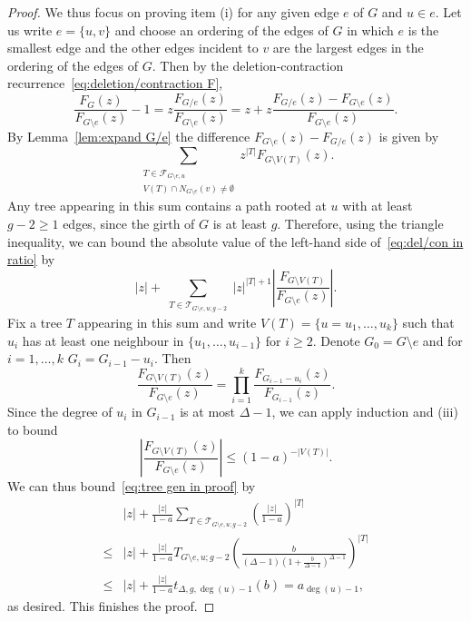 \documentclass[10pt,a4paper]{amsart}
\begin{document}
\begin{proof}
We thus focus on proving item (i) for any given edge $e$ of $G$ and $u\in e$.
Let us write $e=\{u,v\}$ and choose an ordering of the edges of $G$ in which $e$ is the smallest edge and the other edges incident to $v$ are the largest edges in the ordering of the edges of $G$.
Then by the deletion-contraction recurrence~\eqref{eq:deletion/contraction F}, 
\begin{equation}\label{eq:del/con in ratio}
\frac{F_G(z)}{F_{G\setminus e}(z)}-1=z\frac{F_{G/e}(z)}{F_{G\setminus e}(z)}=z+z\frac{F_{G/e}(z)-F_{G\setminus e}(z)}{F_{G\setminus e}(z)}.
 \end{equation}
By Lemma~\ref{lem:expand G/e} the difference $F_{G\setminus e}(z)-F_{G/e}(z)$ is given by
\[
\sum_{\substack{T\in \mathcal{F}_{G\setminus e,u}\\ V(T)\cap 
N_{G\setminus e}(v)\neq \emptyset}} z^{|T|}F_{G\setminus V(T)}(z).
\]
Any tree appearing in this sum contains a path rooted at $u$ with at least $g-2\ge 1$ edges, since the girth of $G$ is at least $g$.
Therefore, using the triangle inequality, we can bound the absolute value of the left-hand side of~\eqref{eq:del/con in ratio} by
\begin{equation}\label{eq:tree gen in proof}
|z|+\sum_{\substack{T\in \mathcal{T}_{G\setminus e,u;g-2}}}|z|^{|T|+1}\left|\frac{F_{G\setminus V(T)}}{F_{G\setminus e}(z)}\right|.
\end{equation}
Fix a tree $T$ appearing in this sum and write $V(T)=\{u=u_1,\ldots,u_k\}$ such that $u_i$ has at least one neighbour in $\{u_1,\ldots,u_{i-1}\}$ for $i\geq 2$. Denote $G_0=G\setminus e$ and for $i=1,\ldots, k$ $G_i=G_{i-1}-u_i$.
Then 
\begin{equation}\label{eq:telescope}
\frac{F_{G\setminus V(T)}(z)}{F_{G\setminus e}(z)}=\prod_{i=1}^k \frac{F_{G_{i-1}-u_i}(z)}{F_{G_{i-1}}(z)}.
\end{equation}
Since the degree of $u_i$ in $G_{i-1}$ is at most $\Delta-1$, we can apply induction and (iii) to bound 
\[
\left|
\frac{F_{G\setminus V(T)}(z)}{F_{G\setminus e}(z)}\right|\leq (1-a)^{-|V(T)|}.
\]
We can thus bound~\eqref{eq:tree gen in proof} by
\begin{align*}
&|z|+\frac{|z|}{1-a}\sum_{T\in \mathcal{T}_{G\setminus e,u;g-2}}\left(\frac{|z|}{1-a}\right)^{|T|} 
\\
\leq &|z|+\frac{|z|}{1-a}T_{G\setminus e,u;g-2}\left(\frac{b}{(\Delta-1)(1+\tfrac{b}{\Delta-1})^{\Delta-1}}\right)^{|T|}
\\
\leq &|z|+\frac{|z|}{1-a}t_{\Delta,g,\deg(u)-1}(b)= a_{\deg(u)-1},
\end{align*}
as desired.
This finishes the proof.
\end{proof}
\end{document}
